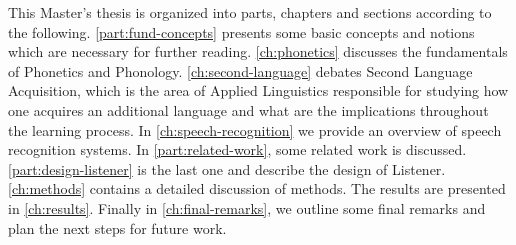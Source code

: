 This Master's thesis is organized into parts, chapters and sections according to the following.
\autoref{part:fund-concepts} presents some basic concepts and notions which are necessary for further reading. \autoref{ch:phonetics} discusses the fundamentals of Phonetics and Phonology. \autoref{ch:second-language} debates Second Language Acquisition, which is the area of Applied Linguistics responsible for studying how one acquires an additional language and what are the implications throughout the learning process. In \autoref{ch:speech-recognition} we provide an overview of speech recognition systems. In \autoref{part:related-work}, some related work is discussed. \autoref{part:design-listener} is the last one and describe the design of Listener. \autoref{ch:methods} contains a detailed discussion of methods. The results are presented in \autoref{ch:results}. Finally in \autoref{ch:final-remarks}, we outline some final remarks and plan the next steps for future work.